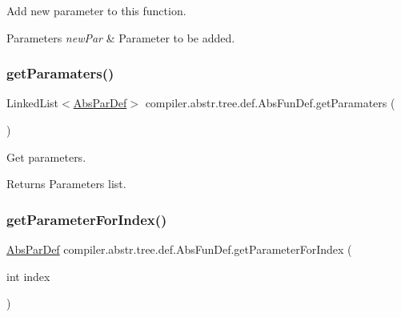 Add new parameter to this function. 
\begin{DoxyParams}{Parameters}
{\em new\+Par} & Parameter to be added. \\
\hline
\end{DoxyParams}
\mbox{\label{classcompiler_1_1abstr_1_1tree_1_1def_1_1_abs_fun_def_adc15deedb95d9b1d1c583fb63755b910}} 
\subsubsection{\texorpdfstring{get\+Paramaters()}{getParamaters()}}
{\footnotesize\ttfamily Linked\+List$<$\hyperlink{classcompiler_1_1abstr_1_1tree_1_1def_1_1_abs_par_def}{Abs\+Par\+Def}$>$ compiler.\+abstr.\+tree.\+def.\+Abs\+Fun\+Def.\+get\+Paramaters (\begin{DoxyParamCaption}{ }\end{DoxyParamCaption})}

Get parameters. \begin{DoxyReturn}{Returns}
Parameters list. 
\end{DoxyReturn}
\mbox{\label{classcompiler_1_1abstr_1_1tree_1_1def_1_1_abs_fun_def_abace2842d9a93985deb64340fa29e622}} 
\subsubsection{\texorpdfstring{get\+Parameter\+For\+Index()}{getParameterForIndex()}}
{\footnotesize\ttfamily \hyperlink{classcompiler_1_1abstr_1_1tree_1_1def_1_1_abs_par_def}{Abs\+Par\+Def} compiler.\+abstr.\+tree.\+def.\+Abs\+Fun\+Def.\+get\+Parameter\+For\+Index (\begin{DoxyParamCaption}\item[{int}]{index }\end{DoxyParamCaption})}

